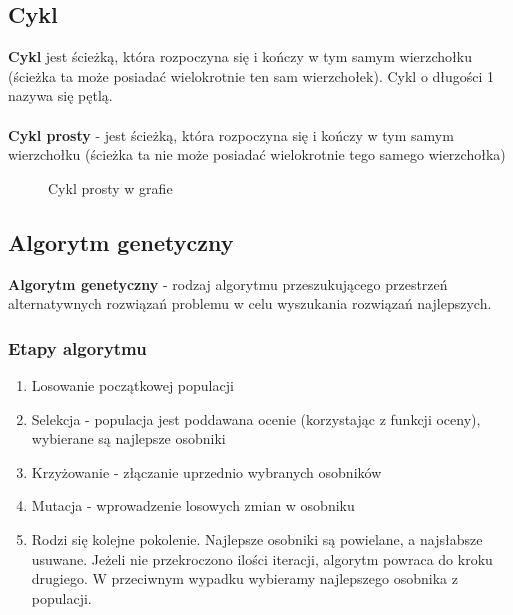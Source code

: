 \documentclass[a4paper,12pt]{article}
\begin{document}
\subsection{Cykl}
\textbf{Cykl} jest ścieżką, która rozpoczyna się i kończy w tym samym wierzchołku (ścieżka ta może posiadać wielokrotnie ten sam wierzchołek). Cykl o długości 1 nazywa się pętlą.
\\
\\
\textbf{Cykl prosty} - jest ścieżką, która rozpoczyna się i kończy w tym samym wierzchołku (ścieżka ta nie może posiadać wielokrotnie tego samego wierzchołka)
\begin{figure}[htbp]
\caption{Cykl prosty w grafie}
\end{figure}
\subsection{Algorytm genetyczny}
\textbf{Algorytm genetyczny} - rodzaj algorytmu przeszukującego przestrzeń alternatywnych rozwiązań problemu w celu wyszukania rozwiązań najlepszych.
\subsubsection{Etapy algorytmu}
\begin{enumerate}
\item Losowanie początkowej populacji
\item Selekcja - populacja jest poddawana ocenie (korzystając z funkcji oceny), wybierane są najlepsze osobniki
\item Krzyżowanie - złączanie uprzednio wybranych osobników
\item Mutacja - wprowadzenie losowych zmian w osobniku
\item Rodzi się kolejne pokolenie. Najlepsze osobniki są powielane, a najsłabsze usuwane. Jeżeli nie przekroczono ilości iteracji, algorytm powraca do kroku drugiego. W przeciwnym wypadku wybieramy najlepszego osobnika z populacji.
\end{enumerate}
\end{document}

